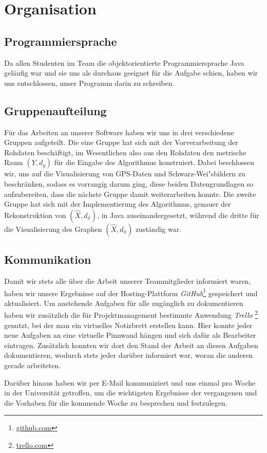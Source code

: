 \documentclass[parskip=half,
 fontsize=12pt, bibtotoc,
 titlepage, ngerman]
 {article}
\begin{document}
\section{Organisation}
\subsection{Programmiersprache}
Da allen Studenten im Team die objektorientierte Programmiersprache Java geläufig war und sie uns als durchaus geeignet für die Aufgabe schien, haben wir uns entschlossen, unser Programm darin zu schreiben.

\subsection{Gruppenaufteilung}
Für das Arbeiten an unserer Software haben wir uns in drei verschiedene Gruppen aufgeteilt. Die eine Gruppe hat sich mit der Vorverarbeitung der Rohdaten beschäftigt, im Wesentlichen also aus den Rohdaten den metrische Raum $\left(Y, d_y\right)$ für die Eingabe des Algorithmus konstruiert. Dabei beschlossen wir, uns auf die Visualisierung von GPS-Daten und Schwarz-Wei"sbildern zu beschr\"anken, sodass es vorrangig darum ging, diese beiden Datengrundlagen so aufzubereiten, dass die nächste Gruppe damit weiterarbeiten konnte. Die zweite Gruppe hat sich mit der Implementierung des Algorithmus, genauer der Rekonstruktion von $(\hat{X}, d_{\hat{x}})$, in Java auseinandergesetzt, während die dritte für die Visualisierung des Graphen $(\hat{X}, d_{\hat{x}})$ zuständig war.

\subsection{Kommunikation}
Damit wir stets alle über die Arbeit unserer Teammitglieder informiert waren, haben wir unsere Ergebnisse auf der Hosting-Plattform \textit{GitHub}\footnote{\url{github.com}} gespeichert und aktualisiert. Um anstehende Aufgaben für alle zugänglich zu dokumentieren haben wir zusätzlich die für Projektmanagement bestimmte Anwendung \textit{Trello} \footnote{\url{trello.com}} genutzt, bei der man ein virtuelles Notizbrett erstellen kann. Hier konnte jeder neue Aufgaben an eine virtuelle Pinnwand hängen und sich dafür als Bearbeiter eintragen. Zusätzlich konnten wir dort den Stand der Arbeit an diesen Aufgaben dokumentieren, wodurch stets jeder darüber informiert war, woran die anderen gerade arbeiteten.

Darüber hinaus haben wir per E-Mail kommuniziert und uns einmal pro Woche in der Universität getroffen, um die wichtigsten Ergebnisse der vergangenen und die Vorhaben für die kommende Woche zu besprechen und festzulegen.
 
\end{document}
